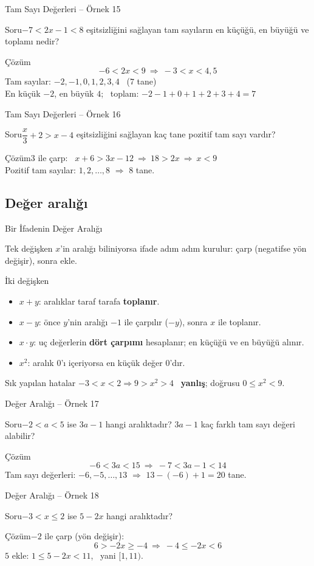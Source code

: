 \documentclass[aspectratio=169,11pt]{beamer}
\newcommand{\soru}[3]{%
\begin{frame}{#1}
  \begin{block}{Soru}\large #2\end{block}
  \pause
  \begin{exampleblock}{Çözüm}\large #3\end{exampleblock}
\end{frame}}
\begin{document}
\soru{Tam Sayı Değerleri -- Örnek 15}
{\(-7<2x-1<8\) eşitsizliğini sağlayan tam sayıların en küçüğü, en büyüğü ve toplamı nedir?}
{\[-6<2x<9\ \Rightarrow\ -3<x<4{,}5\]
Tam sayılar: \(-2,-1,0,1,2,3,4\) \ (\(7\) tane)\\[3pt]
En küçük \(-2\), en büyük \(4\); \ toplam: \(-2-1+0+1+2+3+4=7\)}

\soru{Tam Sayı Değerleri -- Örnek 16}
{\(\dfrac x3+2>x-4\) eşitsizliğini sağlayan kaç tane pozitif tam sayı vardır?}
{\(3\) ile çarp: \ \(x+6>3x-12\ \Rightarrow\ 18>2x\ \Rightarrow\ x<9\)\\[4pt]
Pozitif tam sayılar: \(1,2,\dots,8\) \(\Rightarrow\) \(8\) tane.}

\subsection{Değer aralığı}
\begin{frame}{Bir İfadenin Değer Aralığı}
\begin{block}{Tek değişken}
\(x\)'in aralığı biliniyorsa ifade adım adım kurulur: çarp (negatifse yön değişir), sonra ekle.
\end{block}
\begin{block}{İki değişken}
\begin{itemize}
\item \(x+y\): aralıklar taraf tarafa \textbf{toplanır}.
\item \(x-y\): önce \(y\)'nin aralığı \(-1\) ile çarpılır (\(-y\)), sonra \(x\) ile toplanır.
\item \(x\cdot y\): uç değerlerin \textbf{dört çarpımı} hesaplanır; en küçüğü ve en büyüğü alınır.
\item \(x^2\): aralık \(0\)'ı içeriyorsa en küçük değer \(0\)'dır.
\end{itemize}
\end{block}
\begin{alertblock}{Sık yapılan hatalar}
\(-3<x<2\Rightarrow 9>x^2>4\) \ \textbf{yanlış}; doğrusu \(0\le x^2<9\).
\end{alertblock}
\end{frame}

\soru{Değer Aralığı -- Örnek 17}
{\(-2<a<5\) ise \(3a-1\) hangi aralıktadır? \(3a-1\) kaç farklı tam sayı değeri alabilir?}
{\[-6<3a<15\ \Rightarrow\ -7<3a-1<14\]
Tam sayı değerleri: \(-6,-5,\dots,13\) \(\Rightarrow\) \(13-(-6)+1=20\) tane.}

\soru{Değer Aralığı -- Örnek 18}
{\(-3<x\le 2\) ise \(5-2x\) hangi aralıktadır?}
{\(-2\) ile çarp (yön değişir):
\[6>-2x\ge -4\ \Rightarrow\ -4\le -2x<6\]
\(5\) ekle: \quad \(1\le 5-2x<11\), \ yani \([1,11)\).}
\end{document}
